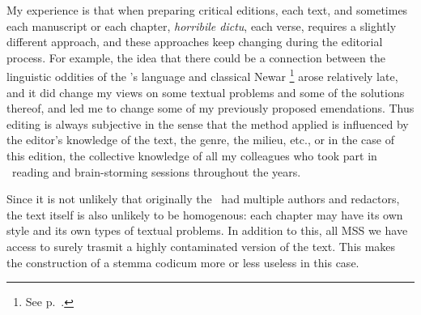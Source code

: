 \noindent
My experience is that when preparing critical editions, each text, 
and sometimes each manuscript or each chapter, \textit{horribile dictu},
each verse, requires a slightly different approach, and these approaches 
keep changing during the editorial process. For example, the idea that 
there could be a connection between the linguistic oddities of 
the \VSS's language and classical Newar%
		\footnote{See p.~\pageref{newar}.}
arose relatively late, and it did change my views on some textual
problems and some of the solutions thereof, and led me to change some
of my previously proposed emendations.
Thus editing is always subjective in the sense that the method
applied is influenced by the editor's knowledge of the text, the genre,
the milieu, etc., or in the case of this edition, the collective knowledge
of all my colleagues who took part in \VSS\ reading and brain-storming
sessions throughout the years. 

Since it is not unlikely that originally the \VSS\ had multiple authors and redactors,
the text itself is also unlikely to be homogenous: each chapter may
have its own style and its own types of textual problems. In addition 
to this, all MSS we have access to surely trasmit a highly contaminated
version of the text. This makes the construction of a stemma codicum more or less
useless in this case.
